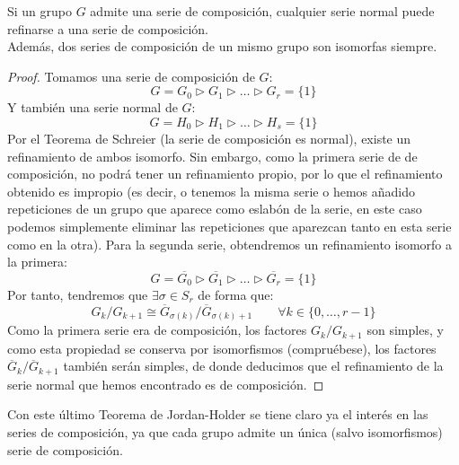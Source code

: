 \begin{teo}
    Si un grupo $G$ admite una serie de composición, cualquier serie normal puede refinarse a una serie de composición.\\

    \noindent
    Además, dos series de composición de un mismo grupo son isomorfas siempre.
    \begin{proof}
        Tomamos una serie de composición de $G$:
        \begin{equation*}
            G= G_0 \rhd G_1 \rhd \ldots \rhd G_r = \{1\}
        \end{equation*}
        Y también una serie normal de $G$:
        \begin{equation*}
            G=H_0 \rhd H_1 \rhd \ldots \rhd H_s = \{1\}
        \end{equation*}
        Por el Teorema de Schreier (la serie de composición es normal), existe un refinamiento de ambos isomorfo. Sin embargo, como la primera serie de de composición, no podrá tener un refinamiento propio, por lo que el refinamiento obtenido es impropio (es decir, o tenemos la misma serie o hemos añadido repeticiones de un grupo que aparece como eslabón de la serie, en este caso podemos simplemente eliminar las repeticiones que aparezcan tanto en esta serie como en la otra). Para la segunda serie, obtendremos un refinamiento isomorfo a la primera:
        \begin{equation*}
            G = \overline{G_0} \rhd \overline{G_1} \rhd \ldots \rhd \overline{G_r} = \{1\}
        \end{equation*}
        Por tanto, tendremos que $\exists \sigma\in S_r$ de forma que:
        \begin{equation*}
            G_k/G_{k+1} \cong \overline{G}_{\sigma(k)}/\overline{G}_{\sigma(k)+1} \qquad \forall k \in \{0,\ldots,r-1\}
        \end{equation*}
        Como la primera serie era de composición, los factores $G_k/G_{k+1}$ son simples, y como esta propiedad se conserva por isomorfismos (compruébese), los factores $\overline{G}_k/\overline{G}_{k+1}$ también serán simples, de donde deducimos que el refinamiento de la serie normal que hemos encontrado es de composición.
    \end{proof}
\end{teo}

\noindent
Con este último Teorema de Jordan-Holder se tiene claro ya el interés en las series de composición, ya que cada grupo admite un única (salvo isomorfismos) serie de composición.\\

